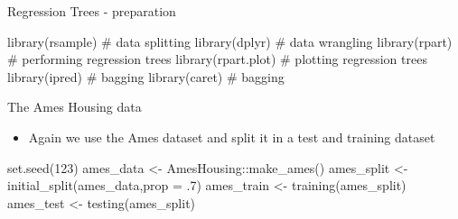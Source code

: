 \documentclass[
  10pt,
  ignorenonframetext,
]{beamer}
\newenvironment{Shaded}{}{}
\newcommand{\CommentTok}[1]{\textcolor[rgb]{0.00,0.50,0.00}{#1}}
\newcommand{\DataTypeTok}[1]{#1}
\newcommand{\DecValTok}[1]{#1}
\newcommand{\FloatTok}[1]{#1}
\newcommand{\KeywordTok}[1]{\textcolor[rgb]{0.00,0.00,1.00}{#1}}
\newcommand{\NormalTok}[1]{#1}
\newcommand{\OperatorTok}[1]{#1}
\newcommand{\StringTok}[1]{\textcolor[rgb]{0.00,0.50,0.50}{#1}}
\providecommand{\tightlist}{%
  \setlength{\itemsep}{0pt}\setlength{\parskip}{0pt}}
\begin{document}
\begin{frame}[fragile]{Regression Trees - preparation}
\protect\hypertarget{regression-trees---preparation}{}

\begin{Shaded}
\begin{Highlighting}[]
\KeywordTok{library}\NormalTok{(rsample)     }\CommentTok{# data splitting }
\KeywordTok{library}\NormalTok{(dplyr)       }\CommentTok{# data wrangling}
\KeywordTok{library}\NormalTok{(rpart)       }\CommentTok{# performing regression trees}
\KeywordTok{library}\NormalTok{(rpart.plot)  }\CommentTok{# plotting regression trees}
\KeywordTok{library}\NormalTok{(ipred)       }\CommentTok{# bagging}
\KeywordTok{library}\NormalTok{(caret)       }\CommentTok{# bagging}
\end{Highlighting}
\end{Shaded}

\end{frame}

\begin{frame}[fragile]{The Ames Housing data}
\protect\hypertarget{the-ames-housing-data}{}

\begin{itemize}
\tightlist
\item
  Again we use the Ames dataset and split it in a test and training
  dataset
\end{itemize}

\begin{Shaded}
\begin{Highlighting}[]
\KeywordTok{set.seed}\NormalTok{(}\DecValTok{123}\NormalTok{)}
\NormalTok{ames_data <-}\StringTok{ }\NormalTok{AmesHousing}\OperatorTok{::}\KeywordTok{make_ames}\NormalTok{()}
\NormalTok{ames_split <-}\StringTok{ }\KeywordTok{initial_split}\NormalTok{(ames_data,}\DataTypeTok{prop =} \FloatTok{.7}\NormalTok{)}
\NormalTok{ames_train <-}\StringTok{ }\KeywordTok{training}\NormalTok{(ames_split)}
\NormalTok{ames_test  <-}\StringTok{ }\KeywordTok{testing}\NormalTok{(ames_split)}
\end{Highlighting}
\end{Shaded}

\end{frame}
\end{document}
